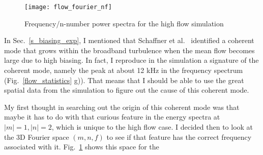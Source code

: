 \begin{figure}[!ht]
\centerline{\texttt{[image: flow\_fourier\_nf]}}
\caption{Frequency/n-number power spectra for the high flow simulation}
\label{flow_fourier_nf}
\end{figure}

In Sec.~\ref{s_biasing_exp}, I mentioned that Schaffner et al.~\cite{schaffner2012} identified a coherent mode that grows within the broadband turbulence when the mean 
flow becomes large due to high biasing. In fact, I reproduce in the simulation a signature of the coherent mode, namely the peak at about 12 kHz in the frequency spectrum (Fig.~\ref{flow_statistics} g)).
That means that I should be able to use the great spatial data from the simulation to figure out the cause of this coherent mode.

My first thought in searching out the origin of this coherent mode was that maybe it has to do with that curious feature in the energy spectra at $|m|=1,|n|=2$, which is unique to the high flow case.
I decided then to look at the 3D Fourier space $(m,n,f)$ to see if that feature has the correct frequency associated with it. Fig.~\ref{flow_fourier_nf} shows this space for the 
